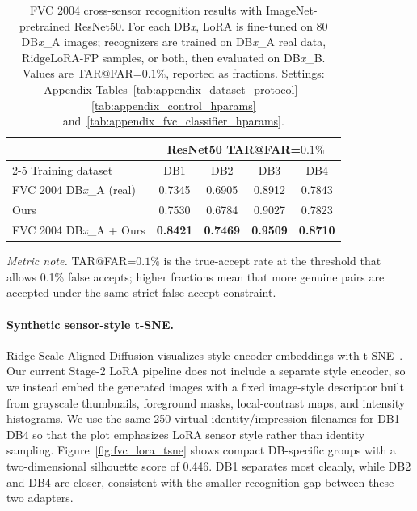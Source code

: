 \documentclass{article}
\newcommand{\method}{RidgeLoRA-FP}
\begin{document}
\begin{table}[!htbp]
    \centering
    \small
    \caption{FVC 2004 cross-sensor recognition results with ImageNet-pretrained
    ResNet50.  For each DB\emph{x}, LoRA is fine-tuned on 80 DB\emph{x}\_A
    images; recognizers are trained on DB\emph{x}\_A real data, \method{}
    samples, or both, then evaluated on DB\emph{x}\_B.  Values are
    TAR@FAR=$0.1\%$, reported as fractions.  Settings: Appendix
    Tables~\ref{tab:appendix_dataset_protocol}--\ref{tab:appendix_control_hparams}
    and~\ref{tab:appendix_fvc_classifier_hparams}.}
    \label{tab:fvc_transfer_resnet50}
    \setlength{\tabcolsep}{5pt}
    \renewcommand{\arraystretch}{0.9}
    \begin{tabular}{lcccc}
        \toprule
        & \multicolumn{4}{c}{ResNet50 TAR@FAR=$0.1\%$} \\
        \cmidrule(lr){2-5}
        Training dataset & DB1 & DB2 & DB3 & DB4 \\
        \midrule
        FVC 2004 DB\emph{x}\_A (real) & 0.7345 & 0.6905 & 0.8912 & 0.7843 \\
        Ours & 0.7530 & 0.6784 & 0.9027 & 0.7823 \\
        \midrule
        FVC 2004 DB\emph{x}\_A + Ours & \textbf{0.8421} & \textbf{0.7469} & \textbf{0.9509} & \textbf{0.8710} \\
        \bottomrule
    \end{tabular}
    \vspace{0.35em}
    \parbox{0.94\linewidth}{\scriptsize\textit{Metric note.}
    TAR@FAR=$0.1\%$ is the true-accept rate at the threshold that allows
    0.1\% false accepts; higher fractions mean that more genuine pairs are
    accepted under the same strict false-accept constraint.}
\end{table}

\paragraph{Synthetic sensor-style t-SNE.}

Ridge Scale Aligned Diffusion visualizes style-encoder embeddings with
t-SNE~\cite{maaten2008visualizing}.  Our current Stage-2 LoRA pipeline does
not include a separate style encoder, so we instead embed the generated images
with a fixed image-style descriptor built from grayscale thumbnails,
foreground masks, local-contrast maps, and intensity histograms.  We use the
same 250 virtual identity/impression filenames for DB1--DB4 so that the plot
emphasizes LoRA sensor style rather than identity sampling.  Figure~\ref{fig:fvc_lora_tsne}
shows compact DB-specific groups with a two-dimensional silhouette score of
0.446.  DB1 separates most cleanly, while DB2 and DB4 are closer, consistent
with the smaller recognition gap between these two adapters.
\end{document}
